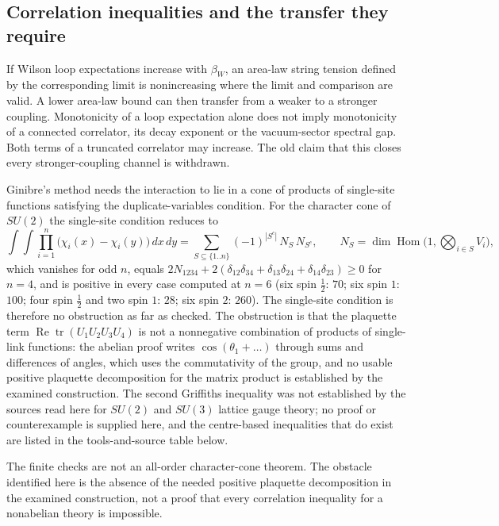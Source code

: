 \documentclass[11pt,a4paper]{article}
\begin{document}
\hypertarget{correlation-inequalities-and-the-transfer-they-require}{%
\subsection{Correlation inequalities and the transfer they
require}\label{correlation-inequalities-and-the-transfer-they-require}}

If Wilson loop expectations increase with \(\beta_W\), an area-law
string tension defined by the corresponding limit is nonincreasing where
the limit and comparison are valid. A lower area-law bound can then
transfer from a weaker to a stronger coupling. Monotonicity of a loop
expectation alone does not imply monotonicity of a connected correlator,
its decay exponent or the vacuum-sector spectral gap. Both terms of a
truncated correlator may increase. The old claim that this closes every
stronger-coupling channel is withdrawn.

Ginibre's method needs the interaction to lie in a cone of products of
single-site functions satisfying the duplicate-variables condition. For
the character cone of \(SU(2)\) the single-site condition reduces to
\[\int\!\!\int\prod_{i=1}^n\big(\chi_i(x)-\chi_i(y)\big)\,dx\,dy
=\sum_{S\subseteq\{1..n\}}(-1)^{|S^c|}\,N_S\,N_{S^c},\qquad
N_S=\dim\operatorname{Hom}\Big(1,\bigotimes_{i\in S}V_i\Big),\] which
vanishes for odd \(n\), equals
\(2N_{1234}+2(\delta_{12}\delta_{34}+\delta_{13}\delta_{24}+\delta_{14}\delta_{23})\ge0\)
for \(n=4\), and is positive in every case computed at \(n=6\) (six spin
\(\tfrac12\): \(70\); six spin \(1\): \(100\); four spin \(\tfrac12\)
and two spin \(1\): \(28\); six spin \(2\): \(260\)). The single-site
condition is therefore no obstruction as far as checked. The obstruction
is that the plaquette term
\(\operatorname{Re}\operatorname{tr}(U_1U_2U_3U_4)\) is not a
nonnegative combination of products of single-link functions: the
abelian proof writes \(\cos(\theta_1+\dots)\) through sums and
differences of angles, which uses the commutativity of the group, and no
usable positive plaquette decomposition for the matrix product is
established by the examined construction. The second Griffiths
inequality was not established by the sources read here for \(SU(2)\)
and \(SU(3)\) lattice gauge theory; no proof or counterexample is
supplied here, and the centre-based inequalities that do exist are
listed in the tools-and-source table below.

The finite checks are not an all-order character-cone theorem. The
obstacle identified here is the absence of the needed positive plaquette
decomposition in the examined construction, not a proof that every
correlation inequality for a nonabelian theory is impossible.
\end{document}

